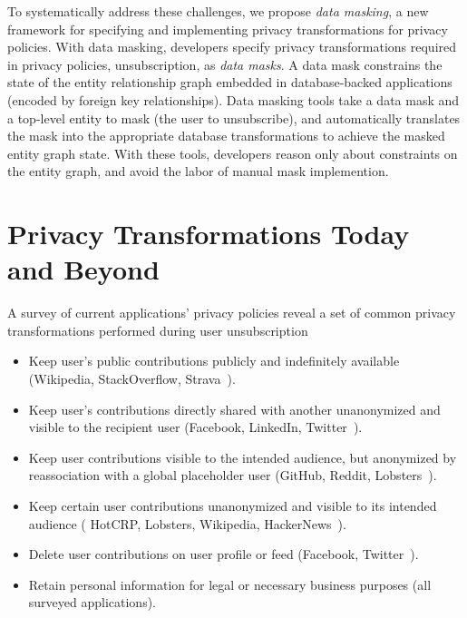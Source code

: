 
To systematically address these challenges, we propose \emph{data masking}, a new framework for
specifying and implementing privacy transformations for privacy policies.
%
With data masking, developers specify privacy transformations required in privacy policies, \eg
unsubscription, as \emph{data masks}. A data mask constrains the state of the entity relationship
graph embedded in database-backed applications (\eg encoded by foreign key relationships).
%
Data masking tools take a data mask and a top-level entity to mask (\eg the user to
unsubscribe), and automatically translates the mask into the appropriate database transformations to
achieve the masked entity graph state. With these tools, developers reason only about constraints on
the entity graph, and avoid the labor of manual mask implemention.

\section{Privacy Transformations Today and Beyond}
\label{sec:survey}
A survey of current applications' privacy policies reveal a set of common privacy transformations performed during user unsubscription
\begin{itemize}[nosep]
    \item Keep user's public contributions publicly and indefinitely available (\eg Wikipedia,
        StackOverflow, Strava~\cite{wikipedia:privacy, stackoverflow:privacy, strava:privacy}).
    \item Keep user's contributions directly shared with another unanonymized and visible to the recipient user (\eg Facebook,
        LinkedIn, Twitter~\cite{twitter:privacy, facebook:privacy, linkedin:privacy}).
    \item Keep user contributions visible to the intended audience, but anonymized by reassociation with a global
        placeholder user (\eg GitHub, Reddit, Lobsters~\cite{github:privacy, reddit:privacy,
        lobsters:privacy}).
    \item Keep certain user contributions unanonymized and visible to its intended audience (\eg
        HotCRP, Lobsters, Wikipedia, HackerNews~\cite{hotcrp:privacy, lobsters:privacy,
        hackernews:privacy, wikipedia:privacy}).
    \item Delete user contributions on user profile or feed (\eg Facebook,
        Twitter~\cite{facebook:privacy, twitter:privacy}).
    \item Retain personal information for legal or necessary business purposes (all surveyed applications).
\end{itemize}


